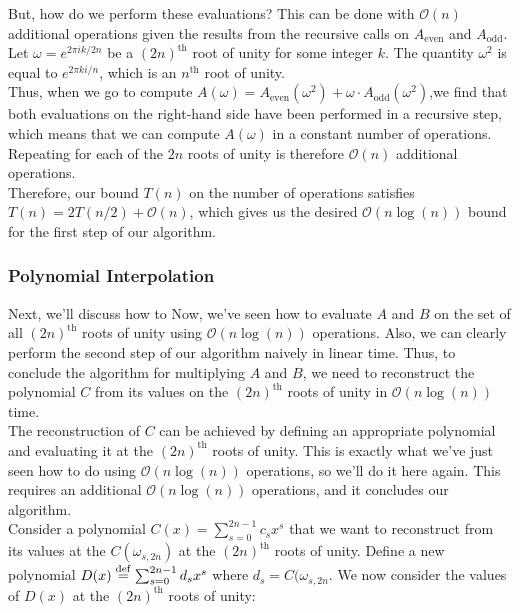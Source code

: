But, how do we perform these evaluations? This can be done with $\mathcal{O}(n)$ additional operations given the results from the recursive calls on $A_{\text{even}}$ and $A_{\text{odd}}$.  Let $\omega = e^{2\pi i k/2n}$ be a $(2n)^{\text{th}}$ root of unity for some integer $k$. The quantity $\omega^{2}$ is equal to $e^{2\pi k i/n}$, which is an $n^{\text{th}}$ root of unity.  \\

Thus, when we go to compute $A(\omega) = A_{\text{even}}(\omega^{2}) + \omega \cdot A_{\text{odd}}(\omega^2)$,we find that both evaluations on the right-hand side have been performed in a recursive step, which means that we can compute $A(\omega)$ in a constant number of operations. Repeating for each of the $2n$ roots of unity is therefore $\mathcal{O}(n)$ additional operations. \\

Therefore, our bound $T(n)$ on the number of operations satisfies $T(n) = 2T(n/2) + \mathcal{O}(n)$, which gives us the desired $\mathcal{O}(n\log(n))$ bound for the first step of our algorithm. \\


\subsubsection{Polynomial Interpolation}

Next, we'll discuss how to Now, we've seen how to evaluate $A$ and $B$ on the set of all $(2n)^{\text{th}}$ roots of unity using $\mathcal{O}(n\log(n))$ operations. Also, we can clearly perform the second step of our algorithm naively in linear time. Thus, to conclude the algorithm for multiplying $A$ and $B$, we need to reconstruct the polynomial $C$ from its values on the $(2n)^{\text{th}}$ roots of unity in $\mathcal{O}(n\log(n))$ time. \\


The reconstruction of $C$ can be achieved by defining an appropriate polynomial and evaluating it at the $(2n)^{\text{th}}$ roots of unity. This is exactly what we've just seen how to do using $\mathcal{O}(n\log(n))$ operations, so we'll do it here again. This requires an additional $\mathcal{O}(n\log(n))$ operations, and it concludes our algorithm. \\

Consider a polynomial $C(x) = \sum_{s=0}^{2n - 1} c_sx^s$ that we want to reconstruct from its values at the $C(\omega_{s, 2n})$ at the $(2n)^{\text{th}}$ roots of unity. Define a new polynomial $D(x) \overset{\mathrm{def}}{=} \sum_{s = 0}^{2n - 1} d_{s}x^{s}$ where $d_s = C(\omega_{s, 2n}$. We now consider the values of $D(x)$ at the $(2n)^{\text{th}}$ roots of unity: 

